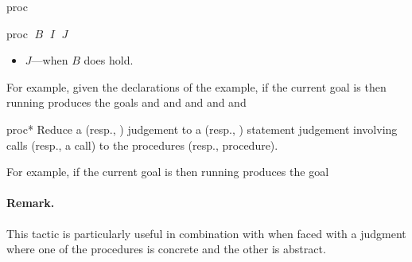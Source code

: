 \begin{tactic}{proc}
\begin{tsyntax}{proc $\;B$ $\;I$ $\;J$}
\begin{itemize}
    \item $J$---when $B$ does hold.
    \end{itemize}

  \medskip
  For example, given the declarations of the  example,
  if the current goal is
   then
  running 
  produces the goals
  and
  and
  and
  and
  and
  \end{tsyntax}

  \begin{tsyntax}{proc*}
    Reduce a \prhl (resp., \phl) judgement to a \prhl (resp., \phl)
    statement judgement involving calls (resp., a call) to the
    procedures (resp., procedure).

  \bigskip
  For example, if the current goal is
   then
  running 
  produces the goal

  \paragraph{Remark.}
  This tactic is particularly useful in combination with
   when faced with a \prhl judgment where one of the
  procedures is concrete and the other is abstract.
  \end{tsyntax}
\end{tactic}

